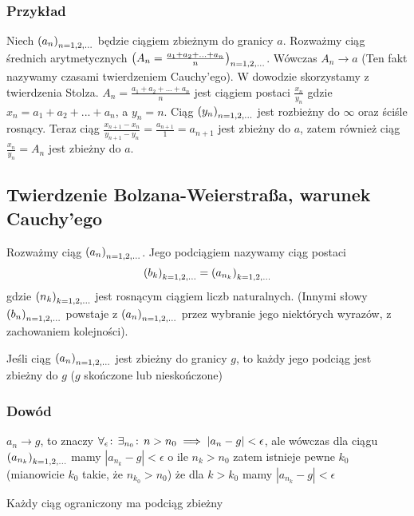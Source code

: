 \documentclass[9pt]{article}
\begin{document}
\subsubsection*{Przykład}

Niech $\left(a_n\right)_{n = 1,2,...}$ będzie ciągiem zbieżnym do granicy $a$. Rozważmy ciąg średnich arytmetycznych
$\left(A_n = \frac{a_1 + a_2 + ... + a_n}{n}\right)_{n = 1,2,...}$. Wówczas $A_n \to a$ (Ten fakt nazywamy czasami
twierdzeniem Cauchy'ego). W dowodzie skorzystamy z twierdzenia Stolza. $A_n = \frac{a_1+a_2 + ... +
a_n}{n}$ jest ciągiem postaci $\frac{x_n}{y_n}$ gdzie $x_n = a_1+a_2 + ... + a_n$, a $y_n = n$. Ciąg
$\left(y_n\right)_{n = 1,2,...}$ jest rozbieżny do $\infty$ oraz ściśle rosnący. Teraz ciąg $\frac{x_{n+1}-x_n}{y_{n+1} -
y_n} = \frac{a_{n+1}}{1} = a_{n+1}$ jest zbieżny do $a$, zatem również ciąg $\frac{x_n}{y_n} = A_n$
jest zbieżny do $a$.

\subsection{Twierdzenie Bolzana-Weierstraßa, warunek Cauchy'ego}

\begin{Def}
    Rozważmy ciąg $\left(a_n\right)_{n = 1,2,...}$. Jego podciągiem nazywamy ciąg postaci
    \[
        \left(b_k\right)_{k = 1,2,...} = \left(a_{n_k}\right)_{k = 1,2,...}
    \]
    gdzie $\left(n_k\right)_{k = 1,2,...}$ jest rosnącym ciągiem liczb naturalnych. (Innymi słowy $\left(b_n\right)_{n = 1,2,...}$
    powstaje z $\left(a_n\right)_{n = 1,2,...}$ przez wybranie jego niektórych wyrazów, z zachowaniem kolejności).
\end{Def}

\begin{Twi}
    Jeśli ciąg $\left(a_n\right)_{n = 1,2,...}$ jest zbieżny do granicy $g$, to każdy jego podciąg jest zbieżny do $g$
    ($g$ skończone lub nieskończone)
\end{Twi}

\subsubsection*{Dowód}
$a_n \to g$, to znaczy $\forall_{\epsilon} \! : \,\exists_{n_0} \! : \, n > n_0 \implies |a_n - g| < \epsilon$, ale wówczas dla
ciągu $\left(a_{n_k}\right)_{k = 1,2,...}$ mamy $|a_{n_k} - g| < \epsilon$ o ile $n_k > n_0$ zatem istnieje pewne
$k_0$ (mianowicie $k_0$ takie, że $n_{k_0} > n_0$) że dla $k > k_0$ mamy $|a_{n_k} - g| < \epsilon$

\begin{Twi}
    Każdy ciąg ograniczony ma podciąg zbieżny 
\end{Twi}
\end{document}
